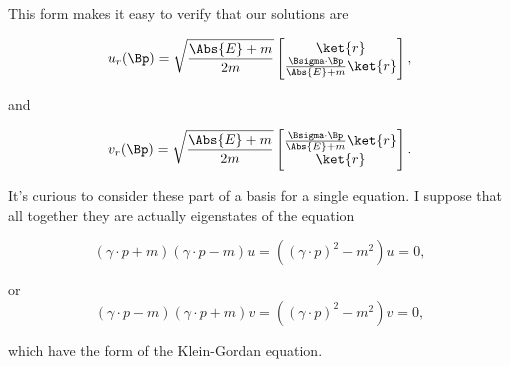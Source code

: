 This form makes it easy to verify that our solutions are

\begin{equation}\label{eqn:desaiDiracAdjoint:30a}
u_r(\Bp) =
\sqrt{\frac{\Abs{E} + m}{2m}}
\begin{bmatrix}
\ket{r} \\
\frac{\Bsigma \cdot \Bp}{\Abs{E} + m} \ket{r}
\end{bmatrix},
\end{equation}

and

\begin{equation}\label{eqn:desaiDiracAdjoint:50a}
v_r(\Bp) =
\sqrt{\frac{\Abs{E} + m}{2m}}
\begin{bmatrix}
\frac{\Bsigma \cdot \Bp}{\Abs{E} + m} \ket{r} \\
\ket{r} \\
\end{bmatrix}.
\end{equation}

It's curious to consider these part of a basis for a single equation.  I suppose that all together they are actually eigenstates of the equation

\begin{equation}\label{eqn:desaiDiracAdjoint:n}
(\gamma \cdot p + m) (\gamma \cdot p - m) u = ((\gamma \cdot p)^2 - m^2) u = 0,
\end{equation}

or
\begin{equation}\label{eqn:desaiDiracAdjoint:n}
(\gamma \cdot p - m) (\gamma \cdot p + m) v = ((\gamma \cdot p)^2 - m^2) v = 0,
\end{equation}

which have the form of the Klein-Gordan equation.

\EndArticle
